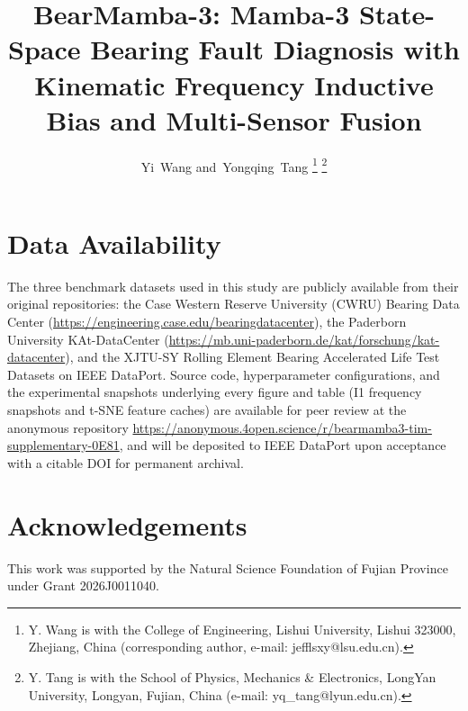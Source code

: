 \documentclass[journal,11pt,a4paper,draftcls,onecolumn]{IEEEtran}
\begin{document}
\title{BearMamba-3: Mamba-3 State-Space Bearing Fault Diagnosis with
       Kinematic Frequency Inductive Bias and Multi-Sensor Fusion}

\author{Yi~Wang
        and~Yongqing~Tang%
\thanks{Y. Wang is with the College of Engineering, Lishui University,
        Lishui 323000, Zhejiang, China (corresponding author, e-mail:
        jefflsxy@lsu.edu.cn).}%
\thanks{Y. Tang is with the School of Physics, Mechanics \& Electronics,
        LongYan University, Longyan, Fujian, China
        (e-mail: yq\_tang@lyun.edu.cn).}}

\maketitle



\linenumbers









\section*{Data Availability}
The three benchmark datasets used in this study are publicly available
from their original repositories: the Case Western Reserve University
(CWRU) Bearing Data Center
(\url{https://engineering.case.edu/bearingdatacenter}),
the Paderborn University KAt-DataCenter
(\url{https://mb.uni-paderborn.de/kat/forschung/kat-datacenter}),
and the XJTU-SY Rolling Element Bearing Accelerated Life Test Datasets
on IEEE DataPort.
Source code, hyperparameter configurations, and the experimental
snapshots underlying every figure and table (I1 frequency snapshots
and t-SNE feature caches) are available for peer review at the
anonymous repository
\url{https://anonymous.4open.science/r/bearmamba3-tim-supplementary-0E81},
and will be deposited to IEEE DataPort upon acceptance with a citable
DOI for permanent archival.

\section*{Acknowledgements}
This work was supported by the Natural Science Foundation of Fujian Province
under Grant 2026J0011040.


\end{document}
